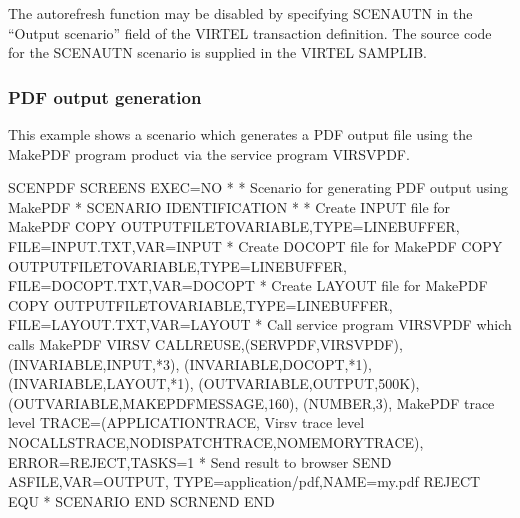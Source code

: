 \documentclass[letterpaper,10pt,english]{sphinxmanual}
\begin{document}
The autorefresh function may be disabled by specifying SCENAUTN in the “Output scenario” field of the VIRTEL
transaction definition. The source code for the SCENAUTN scenario is supplied in the VIRTEL SAMPLIB.


\subsubsection{PDF output generation}
\label{\detokenize{User_Guide:pdf-output-generation}}\label{\detokenize{User_Guide:v457ug-pdf}}
This example shows a scenario which generates a PDF output file using the MakePDF program product via the service
program VIRSVPDF.

\begin{sphinxVerbatim}[commandchars=\\\{\}]
SCENPDF SCREENS EXEC=NO
*
* Scenario for generating PDF output using MakePDF
*
        SCENARIO IDENTIFICATION
*
* Create INPUT file for MakePDF
        COPY\PYGZdl{} OUTPUT\PYGZhy{}FILE\PYGZhy{}TO\PYGZhy{}VARIABLE,TYPE=LINEBUFFER,         \PYGZhy{}
            FILE=\PYGZsq{}INPUT.TXT\PYGZsq{},VAR=\PYGZsq{}INPUT\PYGZsq{}
* Create DOCOPT file for MakePDF
        COPY\PYGZdl{} OUTPUT\PYGZhy{}FILE\PYGZhy{}TO\PYGZhy{}VARIABLE,TYPE=LINEBUFFER,         \PYGZhy{}
            FILE=\PYGZsq{}DOCOPT.TXT\PYGZsq{},VAR=\PYGZsq{}DOCOPT\PYGZsq{}
* Create LAYOUT file for MakePDF
        COPY\PYGZdl{} OUTPUT\PYGZhy{}FILE\PYGZhy{}TO\PYGZhy{}VARIABLE,TYPE=LINEBUFFER,         \PYGZhy{}
            FILE=\PYGZsq{}LAYOUT.TXT\PYGZsq{},VAR=\PYGZsq{}LAYOUT\PYGZsq{}
* Call service program VIRSVPDF which calls MakePDF
        VIRSV\PYGZdl{} CALL\PYGZhy{}REUSE,(\PYGZsq{}SERVPDF\PYGZsq{},\PYGZsq{}VIRSVPDF\PYGZsq{}),              \PYGZhy{}
            (IN\PYGZhy{}VARIABLE,\PYGZsq{}INPUT\PYGZsq{},*3),                          \PYGZhy{}
            (IN\PYGZhy{}VARIABLE,\PYGZsq{}DOCOPT\PYGZsq{},*1),                         \PYGZhy{}
            (IN\PYGZhy{}VARIABLE,\PYGZsq{}LAYOUT\PYGZsq{},*1),                         \PYGZhy{}
            (OUT\PYGZhy{}VARIABLE,\PYGZsq{}OUTPUT\PYGZsq{},500K),                      \PYGZhy{}
            (OUT\PYGZhy{}VARIABLE,\PYGZsq{}MAKEPDFMESSAGE\PYGZsq{},160),               \PYGZhy{}
            (NUMBER,\PYGZsq{}3\PYGZsq{}), MakePDF trace level                  \PYGZhy{}
            TRACE=(APPLICATION\PYGZhy{}TRACE, Virsv trace level        \PYGZhy{}
            NO\PYGZhy{}CALLS\PYGZhy{}TRACE,NO\PYGZhy{}DISPATCH\PYGZhy{}TRACE,NO\PYGZhy{}MEMORY\PYGZhy{}TRACE), \PYGZhy{}
            ERROR=REJECT,TASKS=1
* Send result to browser
       SEND\PYGZdl{} AS\PYGZhy{}FILE,VAR=\PYGZsq{}OUTPUT\PYGZsq{}, \PYGZhy{}
            TYPE=\PYGZsq{}application/pdf\PYGZsq{},NAME=\PYGZsq{}my.pdf\PYGZsq{}
REJECT EQU *
        SCENARIO END
        SCRNEND
END
\end{sphinxVerbatim}
\end{document}

